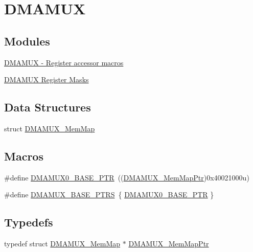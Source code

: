 \hypertarget{group___d_m_a_m_u_x___peripheral}{}\section{D\+M\+A\+M\+U\+X}
\label{group___d_m_a_m_u_x___peripheral}
\subsection*{Modules}
\begin{DoxyCompactItemize}
\item 
\hyperlink{group___d_m_a_m_u_x___register___accessor___macros}{D\+M\+A\+M\+U\+X -\/ Register accessor macros}
\item 
\hyperlink{group___d_m_a_m_u_x___register___masks}{D\+M\+A\+M\+U\+X Register Masks}
\end{DoxyCompactItemize}
\subsection*{Data Structures}
\begin{DoxyCompactItemize}
\item 
struct \hyperlink{struct_d_m_a_m_u_x___mem_map}{D\+M\+A\+M\+U\+X\+\_\+\+Mem\+Map}
\end{DoxyCompactItemize}
\subsection*{Macros}
\begin{DoxyCompactItemize}
\item 
\#define \hyperlink{group___d_m_a_m_u_x___peripheral_ga403b61d306820e4e1113c636300004a3}{D\+M\+A\+M\+U\+X0\+\_\+\+B\+A\+S\+E\+\_\+\+P\+T\+R}~((\hyperlink{group___d_m_a_m_u_x___peripheral_ga736ab5b1ed284b3b4fdb63010a576777}{D\+M\+A\+M\+U\+X\+\_\+\+Mem\+Map\+Ptr})0x40021000u)
\item 
\#define \hyperlink{group___d_m_a_m_u_x___peripheral_gaad218c12978071501dc2899f0624de4b}{D\+M\+A\+M\+U\+X\+\_\+\+B\+A\+S\+E\+\_\+\+P\+T\+R\+S}~\{ \hyperlink{group___d_m_a_m_u_x___peripheral_ga403b61d306820e4e1113c636300004a3}{D\+M\+A\+M\+U\+X0\+\_\+\+B\+A\+S\+E\+\_\+\+P\+T\+R} \}
\end{DoxyCompactItemize}
\subsection*{Typedefs}
\begin{DoxyCompactItemize}
\item 
typedef struct \hyperlink{struct_d_m_a_m_u_x___mem_map}{D\+M\+A\+M\+U\+X\+\_\+\+Mem\+Map} $\ast$ \hyperlink{group___d_m_a_m_u_x___peripheral_ga736ab5b1ed284b3b4fdb63010a576777}{D\+M\+A\+M\+U\+X\+\_\+\+Mem\+Map\+Ptr}
\end{DoxyCompactItemize}


